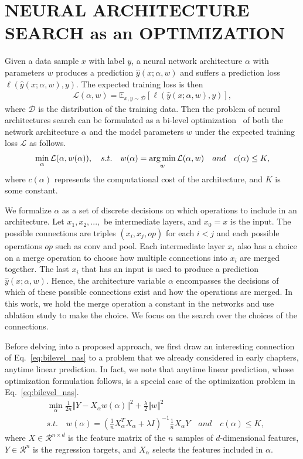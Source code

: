 \section{NEURAL ARCHITECTURE SEARCH as an OPTIMIZATION}

Given a data sample $x$ with label $y$, a neural network architecture $\alpha$ with parameters $w$ produces 
a prediction $\hat{y}(x ; \alpha, w)$ and suffers a prediction loss $\ell(\hat{y}(x ; \alpha, w), y)$.
The expected training loss is then 
\begin{align}
\mathcal{L}(\alpha, w) = \mathbb{E} _{x, y \sim \mathcal{D}} [ \ell(\hat{y}(x ; \alpha, w), y) ] ,
\end{align}
where $\mathcal{D}$ is the distribution of the training data. 
Then the problem of neural architectures search can be formulated as a bi-level optimization~\citep{bilevel_opt}
of both the network architecture $\alpha$ and the model parameters $w$ under the expected training loss $\mathcal{L}$ 
as follows.
\begin{align}
\min _{\alpha} \mathcal{L} (\alpha, w(\alpha)),
\quad
s.t. \quad w(\alpha) = \operatorname*{arg\,min} _w \mathcal{L} (\alpha, w) 
\quad and \quad c(\alpha) \leq K,
\label{eq:bilevel_nas}
\end{align}
where $c(\alpha)$ represents the computational cost of the architecture, and $K$ is some constant. 

We formalize $\alpha$ as a set of discrete decisions on which operations to include in an architecture.
Let $x_1, x_2,...,$ be intermediate layers, and $x_0 = x$ is the input. The possible connections 
are triples $(x_{i}, x_{j}, op)$ for each $i < j$ and each possible operations $op$ such as conv and pool. 
Each intermediate layer $x_i$ also has a choice on a merge operation to choose how multiple connections 
into $x_i$ are merged together. The last $x_i$ that has an input is used to produce a prediction 
$\hat{y}(x; \alpha, w)$. 
Hence, the architecture variable $\alpha$ encompasses the decisions of 
which of these possible connections exist and how the operations are merged. In this work, we hold the 
merge operation a constant in the networks and use ablation study to make the choice. 
We focus on the search over the choices of the connections. 

Before delving into a proposed approach, we first draw an interesting connection of Eq.~\ref{eq:bilevel_nas}
to a problem that we already considered in early chapters, anytime linear prediction.
In fact, we note that anytime linear prediction, whose optimization formulation follows, is a special case
of the optimization problem in Eq.~\ref{eq:bilevel_nas}. 
\begin{align}
&\min _{\alpha} \frac{1}{2n} \Vert Y - X_{\alpha} w(\alpha) \Vert ^2 + \frac{\lambda}{2} \Vert w \Vert ^2 \\
&s.t. \quad w(\alpha) = (\frac{1}{n}X_{\alpha}^TX_{\alpha} + \lambda I)^{-1} \frac{1}{n} X_{\alpha}Y 
\quad and \quad c(\alpha) \leq K,
\label{eq:bilevel_gomp}
\end{align}
where $X \in \mathcal{R}^{n \times d}$ is the feature matrix of the $n$ samples of $d$-dimensional features,
$Y \in \mathcal{R}^n$ is the regression targets, and $X_{\alpha}$ selects the features included in $\alpha$.

